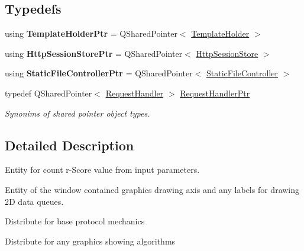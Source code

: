 \subsection*{Typedefs}
\begin{DoxyCompactItemize}
\item 
\mbox{\label{namespaceeven_ad8903dcc68ba98e4dd3e6c6c9a39f0ed}} 
using {\bfseries Template\+Holder\+Ptr} = Q\+Shared\+Pointer$<$ \mbox{\hyperlink{classeven_1_1_template_holder}{Template\+Holder}} $>$
\item 
\mbox{\label{namespaceeven_a7cf92ef91152952ac8b35c87b6837cfe}} 
using {\bfseries Http\+Session\+Store\+Ptr} = Q\+Shared\+Pointer$<$ \mbox{\hyperlink{classstefanfrings_1_1_http_session_store}{Http\+Session\+Store}} $>$
\item 
\mbox{\label{namespaceeven_a2f18d02e877fb4aa1b55526f02e9e417}} 
using {\bfseries Static\+File\+Controller\+Ptr} = Q\+Shared\+Pointer$<$ \mbox{\hyperlink{classstefanfrings_1_1_static_file_controller}{Static\+File\+Controller}} $>$
\item 
\mbox{\label{namespaceeven_a6d0620e401d9607ff9210bb8e34e4947}} 
typedef Q\+Shared\+Pointer$<$ \mbox{\hyperlink{classeven_1_1_request_handler}{Request\+Handler}} $>$ \mbox{\hyperlink{namespaceeven_a6d0620e401d9607ff9210bb8e34e4947}{Request\+Handler\+Ptr}}
\begin{DoxyCompactList}\small\item\em Synonims of shared pointer object types. \end{DoxyCompactList}\end{DoxyCompactItemize}


\subsection{Detailed Description}
Entity for count r-\/\+Score value from input parameters. 

Entity of the window contained graphics drawing axis and any labels for drawing 2D data queues.

Distribute for base protocol mechanics

Distribute for any graphics showing algorithms 